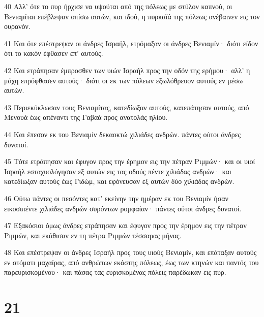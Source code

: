 \par 40 Αλλ' ότε το πυρ ήρχισε να υψούται από της πόλεως με στύλον καπνού, οι Βενιαμίται επέβλεψαν οπίσω αυτών, και ιδού, η πυρκαϊά της πόλεως ανέβαινεν εις τον ουρανόν.
\par 41 Και ότε επέστρεψαν οι άνδρες Ισραήλ, ετρόμαξαν οι άνδρες Βενιαμίν· διότι είδον ότι το κακόν έφθασεν επ' αυτούς.
\par 42 Και ετράπησαν έμπροσθεν των υιών Ισραήλ προς την οδόν της ερήμου· αλλ' η μάχη επρόφθασεν αυτούς· διότι οι εκ των πόλεων εξωλόθρευον αυτούς εν μέσω αυτών.
\par 43 Περιεκύκλωσαν τους Βενιαμίτας, κατεδίωξαν αυτούς, κατεπάτησαν αυτούς, από Μενουά έως απέναντι της Γαβαά προς ανατολάς ηλίου.
\par 44 Και έπεσον εκ του Βενιαμίν δεκαοκτώ χιλιάδες ανδρών. πάντες ούτοι άνδρες δυνατοί.
\par 45 Τότε ετράπησαν και έφυγον προς την έρημον εις την πέτραν Ριμμών· και οι υιοί Ισραήλ εσταχυολόγησαν εξ αυτών εις τας οδούς πέντε χιλιάδας ανδρών· και κατεδίωξαν αυτούς έως Γιδώμ, και εφόνευσαν εξ αυτών δύο χιλιάδας ανδρών.
\par 46 Ούτω πάντες οι πεσόντες κατ' εκείνην την ημέραν εκ του Βενιαμίν ήσαν εικοσιπέντε χιλιάδες ανδρών συρόντων ρομφαίαν· πάντες ούτοι άνδρες δυνατοί.
\par 47 Εξακόσιοι όμως άνδρες ετράπησαν και έφυγον προς την έρημον εις την πέτραν Ριμμών, και εκάθισαν εν τη πέτρα Ριμμών τέσσαρας μήνας.
\par 48 Και επέστρεψαν οι άνδρες Ισραήλ προς τους υιούς Βενιαμίν, και επάταξαν αυτούς εν στόματι μαχαίρας, από ανθρώπων εκάστης πόλεως, έως των κτηνών και παντός του παρευρισκομένου· και πάσας τας ευρισκομένας πόλεις παρέδωκαν εις πυρ.

\chapter{21}

